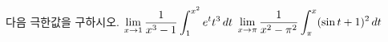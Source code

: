 다음 극한값을 구하시오.
 $\displaystyle\lim_{x\to 1}\dfrac{1}{x^3-1}\int_{1}^{x^2}e^tt^3\mkern3mu dt$
 $\displaystyle\lim_{x\to\pi}\dfrac{1}{x^2-\pi^2}\int_{\pi}^{x}(\sin t+1)^2\mkern3mu dt$
